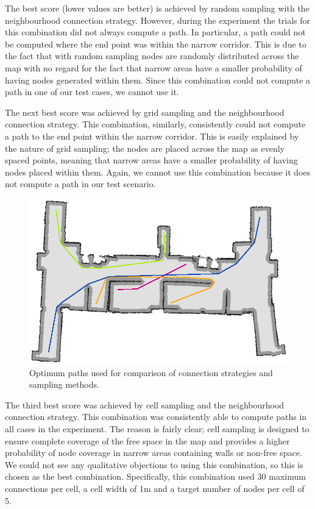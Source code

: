 \documentclass[conference]{IEEEtran}
\begin{document}
The best score (lower values are better) is achieved by random sampling with the neighbourhood connection strategy. However, during the experiment the trials for this combination did not always compute a path. In particular, a path could not be computed where the end point was within the narrow corridor. This is due to the fact that with random sampling nodes are randomly distributed across the map with no regard for the fact that narrow areas have a smaller probability of having nodes generated within them. Since this combination could not compute a path in one of our test cases, we cannot use it.

The next best score was achieved by grid sampling and the neighbourhood connection strategy. This combination, similarly, consistently could not compute a path to the end point within the narrow corridor. This is easily explained by the nature of grid sampling; the nodes are placed across the map as evenly spaced points, meaning that narrow areas have a smaller probability of having nodes placed within them. Again, we cannot use this combination because it does not compute a path in our test scenario.
\begin{figure}
  \includegraphics[width=\columnwidth]{optimumpaths}
  \caption{Optimum paths used for comparison of connection strategies and sampling methods.}
  \label{fig:optimum}
\end{figure}

The third best score was achieved by cell sampling and the neighbourhood connection strategy. This combination was consistently able to compute paths in all cases in the experiment. The reason is fairly clear; cell sampling is designed to ensure complete coverage of the free space in the map and provides a higher probability of node coverage in narrow areas containing walls or non-free space. We could not see any qualitative objections to using this combination, so this is chosen as the best combination. Specifically, this combination used 30 maximum connections per cell, a cell width of 1m and a target number of nodes per cell of 5.
\end{document}
